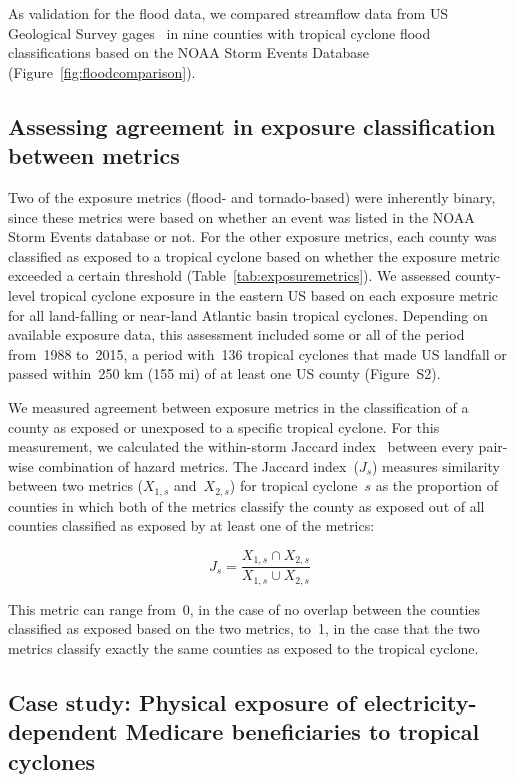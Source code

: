 As validation for the flood data, we compared streamflow data from \ac{US}
Geological Survey gages~\citep{usgsgages, countyfloods, dataRetrieval} in nine
counties with tropical cyclone flood classifications based on the NOAA Storm
Events Database (Figure~\ref{fig:floodcomparison}).

\subsection*{Assessing agreement in exposure classification between
metrics}

Two of the exposure metrics (flood- and tornado-based) were inherently binary,
since these metrics were based on whether an event was listed in the NOAA Storm
Events database or not.  For the other exposure metrics, each county was
classified as exposed to a tropical cyclone based on whether the exposure
metric exceeded a certain threshold (Table~\ref{tab:exposuremetrics}). We
assessed county-level tropical cyclone exposure in the eastern \ac{US} based on
each exposure metric for all land-falling or near-land Atlantic basin tropical
cyclones. Depending on available exposure data, this assessment included some
or all of the period from~1988 to~2015, a period with~136 tropical cyclones
that made \ac{US} landfall or passed within~250 \si{\kilo\metre} (155 mi) of at
least one \ac{US} county (Figure~S2).

We measured agreement between exposure metrics in the classification of a
county as exposed or unexposed to a specific tropical cyclone. For this
measurement, we calculated the within-storm Jaccard
index~\citep{jaccard1901distribution, jaccard1908nouvelles} between every
pair-wise combination of hazard metrics.  The Jaccard index~($J_s$) measures
similarity between two metrics ($X_{1,s}$ and~$X_{2,s}$) for tropical
cyclone~$s$ as the proportion of counties in which both of the metrics classify
the county as exposed out of all counties classified as exposed by at least one
of the metrics:

\begin{equation} 
J_s = \frac{X_{1,s} \cap X_{2,s}}{X_{1,s} \cup X_{2,s}}
\end{equation}

\noindent This metric can range from~0, in the case of no overlap between the
counties classified as exposed based on the two metrics, to~1, in the case that
the two metrics classify exactly the same counties as exposed to the tropical
cyclone.

\subsection*{Case study: Physical exposure of electricity-dependent Medicare
beneficiaries to tropical cyclones}

